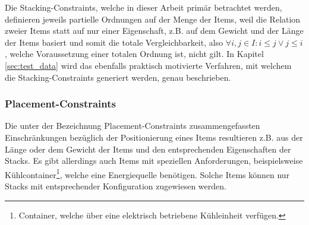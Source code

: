 Die Stacking-Constraints, welche in dieser Arbeit primär betrachtet werden, definieren jeweils partielle
Ordnungen auf der Menge der Items, weil die Relation zweier Items statt auf nur einer Eigenschaft,
z.B. auf dem Gewicht und der Länge der Items basiert und somit die totale Vergleichbarkeit,
also $\forall i, j \in I : i \leq j \lor j \leq i$, welche Voraussetzung einer totalen Ordnung ist, nicht gilt.
In Kapitel \ref{sec:test_data} wird das ebenfalls praktisch motivierte Verfahren, mit welchem die
Stacking-Constraints generiert werden, genau beschrieben.

\subsubsection{Placement-Constraints}
\label{sec:placement_restrictions}

Die unter der Bezeichnung Placement-Constraints zusammengefassten Einschränkungen bezüglich der Positionierung eines
Items resultieren z.B. aus der Länge oder dem Gewicht der Items und den entsprechenden Eigenschaften der Stacks. Es gibt allerdings auch Items mit speziellen Anforderungen, beispielsweise Kühlcontainer\footnote{Container, welche über eine elektrisch betriebene Kühleinheit verfügen.}, welche eine Energiequelle benötigen. Solche Items können nur Stacks mit entsprechender Konfiguration zugewiesen werden.


